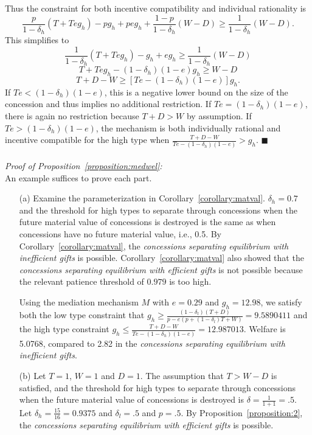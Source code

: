 \documentclass[bibtex,autowc]{apsr_submission}
\newcommand{\de}{\delta}
\begin{document}
{Thus the constraint for both incentive compatibility and individual rationality is
\begin{equation*}
  \frac{p}{1-\de_h}\left(T + Teg_h \right) - pg_h +peg_h+ \frac{1-p}{1-\de_h}\left(W-D\right) \geq \frac{1}{1-\de_h}\left(W-D\right).
\end{equation*}
This simplifies to
\begin{equation*}
  \frac{1}{1-\de_h}\left(T + Teg_h \right) - g_h +eg_h \geq \frac{1	}{1-\de_h}\left(W-D\right)
\end{equation*}
\begin{equation*}
  T + Teg_h - (1-\de_h)(1-e)g_h \geq W-D
\end{equation*}
\begin{equation*}
  T + D - W \geq \left[Te - (1-\de_h)(1-e)\right]g_h. 
\end{equation*}
If $Te < (1-\de_h)(1-e)$, this is a negative lower bound on the size of the concession and thus implies no additional restriction. If $Te = (1-\de_h)(1-e)$, there is again no restriction because $T+D >W$ by assumption. If $Te > (1-\de_h)(1-e)$, the mechanism is both individually rational and incentive compatible for the high type when $\frac{ T + D - W}{Te - (1-\de_h)(1-e)}>g_h$. \hfill $\blacksquare$\\
\\
\emph{Proof of Proposition~\ref{proposition:medwel}:}\\
An example suffices to prove each part.
	\begin{enumerate}
		\item[(a)] Examine the parameterization in Corollary~\ref{corollary:matval}. $\de_h = 0.7$ and the threshold for high types to separate through concessions when the future material value of concessions is destroyed is the same as when concessions have no future material value, i.e., 0.5. By Corollary~\ref{corollary:matval}, the \emph{concessions separating equilibrium with inefficient gifts} is possible. Corollary~\ref{corollary:matval} also showed that the \emph{concessions separating equilibrium with efficient gifts} is not possible because the relevant patience threshold of $0.979$ is too high. 

Using the mediation mechanism $M$ with $e=0.29$ and $g_h=12.98$, we satisfy both the low type constraint that $g_h\geq \frac{\left(1 - \de_l \right)\left(T +D \right)}{p - e\left(p +(1-\de_l)T +W \right)}=9.5890411$ and the high type constraint $g_h\leq \frac{ T + D - W}{Te - (1-\de_h)(1-e)}=12.987013$. Welfare is 5.0768, compared to 2.82 in the \emph{concessions separating equilibrium with inefficient gifts}.
		\item[(b)] Let $T = 1$, $W=1$ and $D = 1$. The assumption that $T > W - D$ is satisfied, and the threshold for high types to separate through concessions when the future material value of concessions is destroyed is $\de = \frac{1}{1+1} = .5$. Let $\de_h = \frac{15}{16}=0.9375$ and $\de_l = .5$ and $p = .5$. By Proposition~\ref{proposition:2}, the \emph{concessions separating equilibrium with efficient gifts} is possible.


\end{enumerate}}
\end{document}
